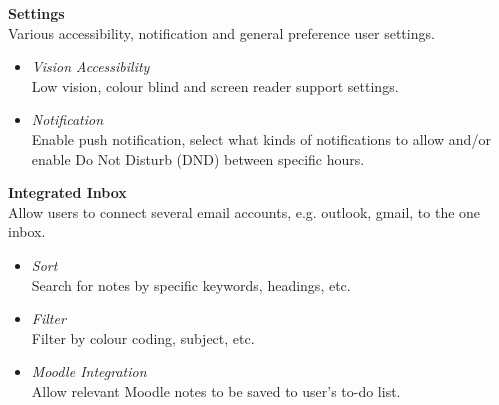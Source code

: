 \textbf{Settings}\\
     Various accessibility, notification and general preference user settings.
\begin{itemize}
  \item \textit{Vision Accessibility}\\
       Low vision, colour blind and screen reader support settings.
  \item \textit{Notification}\\
       Enable push notification, select what kinds of notifications to allow and/or enable Do Not Disturb (DND) between specific hours.
  \end{itemize}


\textbf{Integrated Inbox}\\
    Allow users to connect several email accounts, e.g. outlook, gmail, to the one inbox.
\begin{itemize}
  \item \textit{Sort}\\
        Search for notes by specific keywords, headings, etc.
  \item \textit{Filter}\\
       Filter by colour coding, subject, etc.
  \item \textit{Moodle Integration}\\
       Allow relevant Moodle notes to be saved to user's to-do list.
  \end{itemize}



